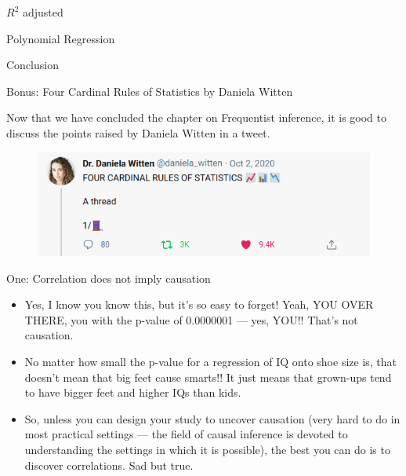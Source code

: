 \documentclass[handout]{beamer}
\begin{document}
\begin{frame}{$R^2$ adjusted}
 

 
\end{frame}

\begin{frame}{Polynomial Regression}
 

 
\end{frame}

\begin{frame}{Conclusion}
 

 
\end{frame}


\begin{frame}{Bonus: Four Cardinal Rules of Statistics by Daniela Witten}
\scriptsize{

Now that we have concluded the chapter on Frequentist inference, it is good to discuss the points raised by Daniela Witten in a tweet.

\begin{figure}[h!]
	\centering
	\includegraphics[scale=0.3]{pics/witten.png}
\end{figure}


\begin{block}{One: Correlation does not imply causation}
\begin{itemize}
 \item Yes, I know you know this, but it’s so easy to forget! Yeah, YOU OVER THERE, you with the p-value of 0.0000001 — yes, YOU!! That’s not causation.
 \item No matter how small the p-value for a regression of IQ onto shoe size is, that doesn’t mean that big feet cause smarts!!  It just means that grown-ups tend to have bigger feet and higher IQs than kids.
 \item So, unless you can design your study to uncover causation (very hard to do in most practical settings — the field of causal inference is devoted to understanding the settings in which it is possible), the best you can do is to discover correlations.  Sad but true.
\end{itemize}

 
\end{block}




} 
\end{frame}
\end{document}
